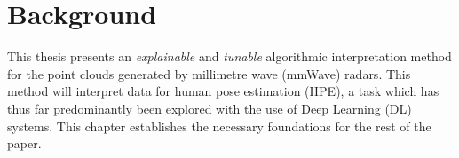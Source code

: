 \chapter{Background}
\label{chapter: background}

This thesis presents an \textit{explainable} and \textit{tunable} algorithmic interpretation method for the point clouds generated by millimetre wave (mmWave) radars.
This method will interpret data for human pose estimation (HPE), a task which has thus far predominantly been explored with the use of Deep Learning (DL) systems.
This chapter establishes the necessary foundations for the rest of the paper.







% 

